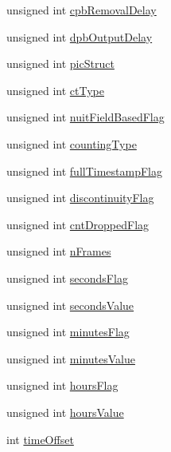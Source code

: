 \begin{DoxyCompactItemize}
\item 
unsigned int \hyperlink{struct_a_r_s_t_r_e_a_m2___h264_writer___picture_timing_sei__t_ac40667b1349b9839c06e7c2ae54cda82}{cpb\+Removal\+Delay}
\item 
unsigned int \hyperlink{struct_a_r_s_t_r_e_a_m2___h264_writer___picture_timing_sei__t_a8abed9ba759ba5be3fa9932673b2b310}{dpb\+Output\+Delay}
\item 
unsigned int \hyperlink{struct_a_r_s_t_r_e_a_m2___h264_writer___picture_timing_sei__t_adc7fea7d9943eb5e048263751f0e3021}{pic\+Struct}
\item 
unsigned int \hyperlink{struct_a_r_s_t_r_e_a_m2___h264_writer___picture_timing_sei__t_a65011583fa321c199c034da3b23a656f}{ct\+Type}
\item 
unsigned int \hyperlink{struct_a_r_s_t_r_e_a_m2___h264_writer___picture_timing_sei__t_a8e2184112694909d7e533147d3aa2d37}{nuit\+Field\+Based\+Flag}
\item 
unsigned int \hyperlink{struct_a_r_s_t_r_e_a_m2___h264_writer___picture_timing_sei__t_a36cce5145c75233bd3544fddfaeb4b2b}{counting\+Type}
\item 
unsigned int \hyperlink{struct_a_r_s_t_r_e_a_m2___h264_writer___picture_timing_sei__t_a1db2847e0f6857c8d6ef3e1514ce5fd5}{full\+Timestamp\+Flag}
\item 
unsigned int \hyperlink{struct_a_r_s_t_r_e_a_m2___h264_writer___picture_timing_sei__t_ac16b1182fe130386be03ac5b02c98af8}{discontinuity\+Flag}
\item 
unsigned int \hyperlink{struct_a_r_s_t_r_e_a_m2___h264_writer___picture_timing_sei__t_aff116312494e9b80439de4f64facd30f}{cnt\+Dropped\+Flag}
\item 
unsigned int \hyperlink{struct_a_r_s_t_r_e_a_m2___h264_writer___picture_timing_sei__t_ab52405eea05885ecd2017e84252a2236}{n\+Frames}
\item 
unsigned int \hyperlink{struct_a_r_s_t_r_e_a_m2___h264_writer___picture_timing_sei__t_aea4792ac9f9f6f14f4705c1217f3e560}{seconds\+Flag}
\item 
unsigned int \hyperlink{struct_a_r_s_t_r_e_a_m2___h264_writer___picture_timing_sei__t_afaee6f8411a520ad46e55f02329722cb}{seconds\+Value}
\item 
unsigned int \hyperlink{struct_a_r_s_t_r_e_a_m2___h264_writer___picture_timing_sei__t_a0e816a9c5993eef1b1ccaae4b3cf1561}{minutes\+Flag}
\item 
unsigned int \hyperlink{struct_a_r_s_t_r_e_a_m2___h264_writer___picture_timing_sei__t_a81c32475b80f2e718068fb1ac7fb2f9b}{minutes\+Value}
\item 
unsigned int \hyperlink{struct_a_r_s_t_r_e_a_m2___h264_writer___picture_timing_sei__t_afbde028cbb1339546cdc415538fe5b8a}{hours\+Flag}
\item 
unsigned int \hyperlink{struct_a_r_s_t_r_e_a_m2___h264_writer___picture_timing_sei__t_a7b02a3783afd668a32652090ace068fc}{hours\+Value}
\item 
int \hyperlink{struct_a_r_s_t_r_e_a_m2___h264_writer___picture_timing_sei__t_ae2ca661c9c9fa76f8e833c29075adbb9}{time\+Offset}
\end{DoxyCompactItemize}


